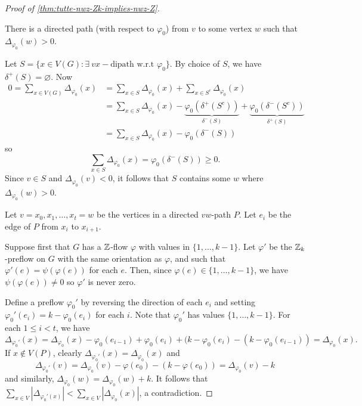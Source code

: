 \documentclass[main.tex]{subfiles}
\begin{document}
\begin{proof}[Proof of \th\ref{thm:tutte-nwz-Zk-implies-nwz-Z}]
  \begin{claim}
    There is a directed path (with respect to $\varphi_0$) from $v$ to some
    vertex $w$ such that $\Delta_{\varphi_0}(w) > 0$.
  \end{claim}
  \begin{subproof}
    Let $S = \{x\in V(G) : \exists\ vx-\text{dipath w.r.t }\varphi_0\}$.
    By choice of $S$, we have $\delta^+(S) = \varnothing$.
    Now
    \begin{align*}
      0 = \sum_{x\in V(G)}\Delta_{\varphi_0}(x)
      &= \sum_{x\in S}\Delta_{\varphi_0}(x) + \sum_{x\in S^c}\Delta_{\varphi_0}(x) \\
      &= \sum_{x\in S}\Delta_{\varphi_0}(x)
          - \underbrace{\varphi_0(\delta^+(S^c))}_{\delta^-(S)}
          + \underbrace{\varphi_0(\delta^-(S^c))}_{\delta^+(S)} \\
      &= \sum_{x\in S}\Delta_{\varphi_0}(x) - \varphi_0(\delta^-(S))
    \end{align*}
    so
    \[
      \sum_{x\in S}\Delta_{\varphi_0}(x) = \varphi_0(\delta^-(S))\geq 0.
    \]
    Since $v\in S$ and $\Delta_{\varphi_0}(v) < 0$, it follows that $S$ contains
    some $w$ where $\Delta_{\varphi_0}(w) > 0$.
  \end{subproof}

  Let $v = x_0, x_1, \ldots, x_t = w$ be the vertices in a directed $vw$-path
  $P$.
  Let $e_i$ be the edge of $P$ from $x_i$ to $x_{i+1}$.

  Suppose first that $G$ has a $\mathbb Z$-flow $\varphi$ with values in $\{1,\ldots,k-1\}$.
  Let $\varphi'$ be the $\mathbb Z_k$-preflow on $G$ with the same orientation as $\varphi$,
  and such that $\varphi'(e) = \psi(\varphi(e))$ for each $e$.
  Then, since $\varphi(e)\in\{1,\ldots,k-1\}$, we have $\psi(\varphi(e))\neq 0$
  so $\varphi'$ is never zero.

  Define a preflow $\varphi_0'$ by reversing the direction of each $e_i$ and
  setting $\varphi_0'(e_i) = k - \varphi_0(e_i)$ for each $i$.
  Note that $\varphi_0'$ has values $\{1,\ldots,k-1\}$.
  For each $1\leq i < t$, we have
  \[
    \Delta_{\varphi_0'}(x) = \Delta_{\varphi_0}(x) - \varphi_0(e_{i-1})
    + \varphi_0(e_i) + (k - \varphi_0(e_i) - (k - \varphi_0(e_{i-1})) = \Delta_{\varphi_0}(x).
  \]
  If $x\notin V(P)$, clearly $\Delta_{\varphi_0'}(x) = \Delta_{\varphi_0}(x)$ and
  \[
    \Delta_{\varphi_0'}(v) = \Delta_{\varphi_0}(v) - \varphi(e_0) - (k - \varphi(e_0))
    = \Delta_{\varphi_0}(v) - k
  \]
  and similarly, $\Delta_{\varphi_0}(w) = \Delta_{\varphi_0}(w) + k$.
  It follows that
  $\sum_{x\in V}|\Delta_{\varphi_0'(x)}| < \sum_{x\in V}|\Delta_{\varphi_0}(x)|$,
  a contradiction.
\end{proof}
\end{document}
